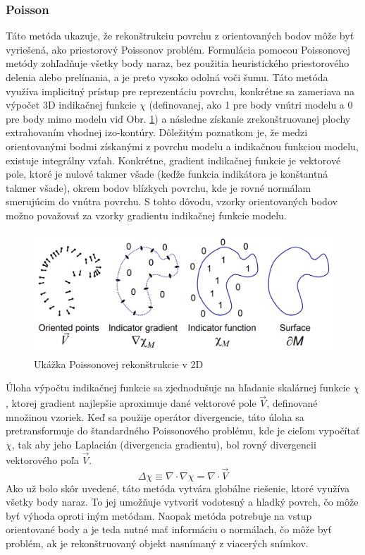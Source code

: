 \subsubsection{Poisson} \label{sec:poisson}
\noindent Táto metóda ukazuje, že rekonštrukciu povrchu z orientovaných bodov môže byť vyriešená, ako priestorový Poissonov problém. Formulácia pomocou Poissonovej metódy zohľadňuje všetky body naraz, bez použitia heuristického priestorového delenia alebo prelínania, a je preto vysoko odolná voči šumu. \cite{poisson_origin}
\newline\indent Táto metóda využíva implicitný prístup pre reprezentáciu povrchu, konkrétne sa zameriava na výpočet 3D indikačnej funkcie $\chi$ (definovanej, ako 1 pre body vnútri modelu a 0 pre body mimo modelu viď Obr. \ref{fig:poisson}) a následne získanie zrekonštruovanej plochy extrahovaním vhodnej izo-kontúry. Dôležitým poznatkom je, že medzi orientovanými bodmi získanými z povrchu modelu a indikačnou funkciou modelu, existuje integrálny vzťah. Konkrétne, gradient indikačnej funkcie je vektorové pole, ktoré je nulové takmer všade (keďže funkcia indikátora je konštantná takmer všade), okrem bodov blízkych povrchu, kde je rovné normálam smerujúcim do vnútra povrchu. S tohto dôvodu, vzorky orientovaných bodov možno považovať za vzorky gradientu indikačnej funkcie modelu. \cite{poisson_origin}
\begin{figure}[!htbp]
  \centering
  \includegraphics[width=14cm]{img/poisson.png}
  \caption{Ukážka Poissonovej rekonštrukcie v 2D \cite{poisson_origin}} 
  \label{fig:poisson}
\end{figure} 
\newline\indent Úloha výpočtu indikačnej funkcie sa zjednodušuje na hľadanie skalárnej funkcie $\chi$, ktorej gradient najlepšie aproximuje dané vektorové pole $\vec{V}$, definované množinou vzoriek. Keď sa použije operátor divergencie, táto úloha sa pretransformuje do štandardného Poissonového problému, kde je cieľom vypočítať $\chi$, tak aby jeho Laplacián (divergencia gradientu), bol rovný divergencii vektorového poľa $\vec{V}$. \cite{poisson_origin}
\begin{equation}
    \Delta \chi \equiv \nabla \cdot \nabla \chi = \nabla \cdot \vec{V}
    \label{eq:poisson}
\end{equation}
\indent Ako už bolo skôr uvedené, táto metóda vytvára globálne riešenie, ktoré využíva všetky body naraz. To jej umožňuje vytvoriť vodotesný a hladký povrch, čo môže byť výhoda oproti iným metódam. Naopak metóda potrebuje na vstup orientované body a je teda nutné mať informáciu o normálach, čo môže byť problém, ak je rekonštruovaný objekt nasnímaný z viacerých snímkov.   

